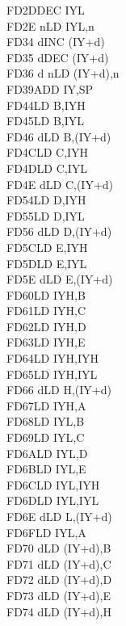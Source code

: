\begin{multicols}{3}
{\begin{tabbing}
    FD2D\>DEC IYL\UNDOC\\
    FD2E n\>LD IYL,n\UNDOC\\
    FD34 d\>INC (IY+d)\\
    FD35 d\>DEC (IY+d)\\
    FD36 d n\>LD (IY+d),n\\
    FD39\>ADD IY,SP\\
    FD44\>LD B,IYH\UNDOC\\
    FD45\>LD B,IYL\UNDOC\\
    FD46 d\>LD B,(IY+d)\\
    FD4C\>LD C,IYH\UNDOC\\
    FD4D\>LD C,IYL\UNDOC\\
    FD4E d\>LD C,(IY+d)\\
    FD54\>LD D,IYH\UNDOC\\
    FD55\>LD D,IYL\UNDOC\\
    FD56 d\>LD D,(IY+d)\\
    FD5C\>LD E,IYH\UNDOC\\
    FD5D\>LD E,IYL\UNDOC\\
    FD5E d\>LD E,(IY+d)\\
    FD60\>LD IYH,B\UNDOC\\
    FD61\>LD IYH,C\UNDOC\\
    FD62\>LD IYH,D\UNDOC\\
    FD63\>LD IYH,E\UNDOC\\
    FD64\>LD IYH,IYH\UNDOC\\
    FD65\>LD IYH,IYL\UNDOC\\
    FD66 d\>LD H,(IY+d)\\
    FD67\>LD IYH,A\UNDOC\\
    FD68\>LD IYL,B\UNDOC\\
    FD69\>LD IYL,C\UNDOC\\
    FD6A\>LD IYL,D\UNDOC\\
    FD6B\>LD IYL,E\UNDOC\\
    FD6C\>LD IYL,IYH\UNDOC\\
    FD6D\>LD IYL,IYL\UNDOC\\
    FD6E d\>LD L,(IY+d)\\
    FD6F\>LD IYL,A\UNDOC\\
    FD70 d\>LD (IY+d),B\\
    FD71 d\>LD (IY+d),C\\
    FD72 d\>LD (IY+d),D\\
    FD73 d\>LD (IY+d),E\\
    FD74 d\>LD (IY+d),H\\

\end{tabbing}}
\end{multicols}
